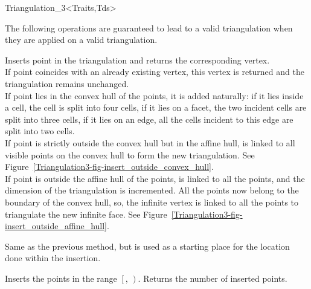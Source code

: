 \begin{ccClassTemplate}{Triangulation_3<Traits,Tds>}

The following operations are guaranteed to lead to a valid triangulation 
when they are applied on a valid triangulation.

{Inserts point  in the triangulation and returns the corresponding
 vertex.\\
If point  coincides with an already existing vertex, this 
vertex is returned and the triangulation remains unchanged.\\
If point  lies in the convex hull of the points, it is added
naturally: if it lies inside a cell, the cell is split into four
cells, if it lies on a facet, the two incident cells are split into
three cells, if it lies on an edge, all the cells incident to this
edge are split into two cells.\\
If point  is strictly outside the convex hull but in the affine
hull,  is linked to all visible points on the convex hull to
form the new triangulation. See
Figure~\ref{Triangulation3-fig-insert_outside_convex_hull}.\\  
If point  is outside the affine hull of the points,  is
linked to all the points, and the dimension of the triangulation is
incremented. All the points now belong to the boundary of the convex
hull, so, the infinite vertex is linked to all the points to
triangulate the new infinite face. See 
Figure~\ref{Triangulation3-fig-insert_outside_affine_hull}.}

{Same as the previous method, but  is used as a starting
place for the location done within the insertion.}

{Inserts the points in the range $\left[\right.$,
$\left.\right)$.  Returns the number of inserted points.
}


\end{ccClassTemplate}
